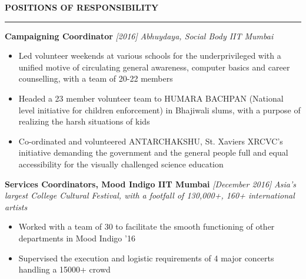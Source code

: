\documentclass[10 pt]{article}%
\begin{document}
{{{{{{{{{\begin{flushleft}\bf{\Large{\textcolor{color2}{POSITIONS OF RESPONSIBILITY}}}\end{flushleft}
\vspace{-5pt}
\hrule
\vspace{1 pt}
{\flushleft \textbf {\large{Campaigning Coordinator}} \hfill {{{\em{[2016]}}}}
	\vspace{-0.8em}
	{\flushleft \em{Abhuydaya, Social Body IIT Mumbai}}
	\vspace{-5pt}
	\begin{itemize}[leftmargin=*]
		\setlength\itemsep{1.5pt}
		\setlength\parskip{1.5pt}
		\item Led volunteer weekends at various schools for the underprivileged with a unified motive of circulating general awareness, computer basics and career counselling, with a team of 20-22 members
		\item Headed a 23 member volunteer team to HUMARA BACHPAN (National level initiative for children enforcement) in Bhajiwali slums, with a purpose of realizing the harsh situations of kids
			\item Co-ordinated and volunteered ANTARCHAKSHU, St. Xaviers XRCVC's  initiative demanding the government and the general people full and equal accessibility for the visually challenged science education
	\end{itemize}
{\flushleft \textbf {\large{Services Coordinators, Mood Indigo IIT Mumbai}} \hfill {{{\em{[December 2016]}}}}
	\vspace{-0.8em}
	{\flushleft \em{Asia's largest College Cultural Festival, with a footfall of 130,000+, 160+ international artists}}
	\vspace{-5pt}
	\begin{itemize}[leftmargin=*]
		\setlength\itemsep{1.5pt}
		\setlength\parskip{1.5pt}
		\item Worked with a team of 30 to facilitate the smooth functioning of other departments in Mood Indigo '16
		\item Supervised the execution and logistic requirements of 4 major concerts handling a 15000+ crowd
	\end{itemize}
}}}}}}}}}}}
\end{document}
